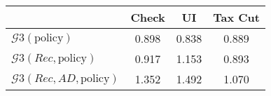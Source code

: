 \begin{tabular}{@{}lccc@{}} 
\toprule 
                          & Check      & UI    & Tax Cut    \\  \midrule 
$\mathcal{G}3(\text{policy})$ & 0.898  & 0.838  & 0.889     \\ 
$\mathcal{G}3(Rec,\text{policy})$ & 0.917  & 1.153  & 0.893     \\ 
$\mathcal{G}3(Rec, AD,\text{policy})$ & 1.352  & 1.492  & 1.070     \\ 
\end{tabular}  
